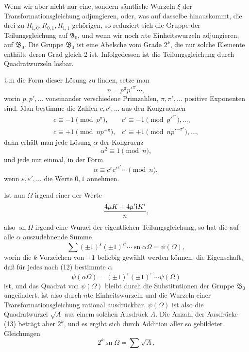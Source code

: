 \documentclass[11pt]{article}
\providecommand{\ii}{\mathrm{i}}
\providecommand{\sn}{\operatorname{sn}}
\begin{document}
Wenn wir aber nicht nur eine, sondern sämtliche Wurzeln $\xi$ der Transformationsgleichung
adjungieren, oder, was auf dasselbe hinauskommt, die drei zu $R_{1,0},R_{0,1},R_{1,1}$
gehörigen, so reduziert sich die Gruppe der Teilungsgleichung auf $\mathfrak A_0$, und wenn
wir noch $n$te Einheitswurzeln adjungieren, auf $\mathfrak B_0$. Die Gruppe $\mathfrak B_0$
ist eine Abelsche vom Grade $2^k$, die nur solche Elemente enthält, deren Grad gleich $2$
ist. Infolgedessen ist die Teilungsgleichung durch Quadratwurzeln lösbar.

Um die Form dieser Lösung zu finden, setze man
\[
 n=p^\pi p'^{\pi'}\cdots,
\]
worin $p,p',\ldots$ voneinander verschiedene Primzahlen, $\pi,\pi',\ldots$ positive
Exponenten sind. Man bestimme die Zahlen $c,c',\ldots$ aus den Kongruenzen
\[
\begin{array}{ll}
 c\equiv-1\pmod {p^\pi},& c'\equiv-1\pmod {p'^{\pi'}},\ldots,\\
 c\equiv+1\pmod {n p^{-\pi}},& c'\equiv+1\pmod {n p'^{-\pi'}},\ldots,
\end{array}
\]
dann erhält man jede Lösung $\alpha$ der Kongruenz
\[
 \alpha^2\equiv1\pmod n,
\]
und jede nur einmal, in der Form
\begin{equation}
 \alpha\equiv c^\varepsilon c'^{\varepsilon'}\cdots\pmod n,
\tag{12}
\end{equation}
wenn $\varepsilon,\varepsilon',\ldots$ die Werte $0,1$ annehmen.

Ist nun $\Omega$ irgend einer der Werte
\[
 {4\mu K+4\mu'\ii K'\over n},
\]
also $\sn\Omega$ irgend eine Wurzel der eigentlichen Teilungsgleichung, so hat die auf alle
$\alpha$ auszudehnende Summe
\begin{equation}
 \sum(\pm1)^\varepsilon(\pm1)^{\varepsilon'}\cdots\sn\alpha\Omega=\psi(\Omega),
\tag{13}
\end{equation}
worin die $k$ Vorzeichen von $\pm1$ beliebig gewählt werden können, die Eigenschaft, daß
für jedes nach (12) bestimmte $\alpha$
\begin{equation}
 \psi(\alpha\Omega)=(\pm1)^\varepsilon(\pm1)^{\varepsilon'}\cdots\psi(\Omega)
\tag{14}
\end{equation}
ist, und das Quadrat von $\psi(\Omega)$ bleibt durch die Substitutionen der Gruppe
$\mathfrak B_0$ ungeändert, ist also durch $n$te Einheitswurzeln und die Wurzeln einer
Transformationsgleichung rational ausdrückbar. $\psi(\Omega)$ ist also die Quadratwurzel
$\sqrt A$ aus einem solchen Ausdruck $A$. Die Anzahl der Ausdrücke (13) beträgt aber
$2^k$, und es ergibt sich durch Addition aller so gebildeter Gleichungen
\begin{equation}
 2^k\sn\Omega=\sum\sqrt A.
\tag{15}
\end{equation}
\end{document}
